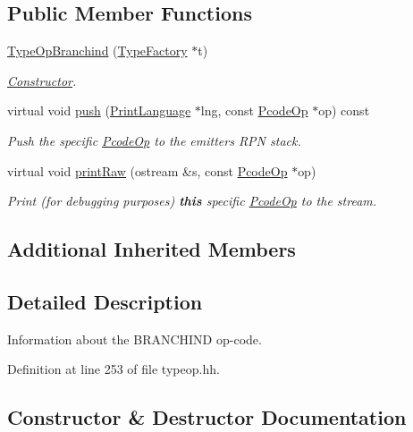 \subsection*{Public Member Functions}
\begin{DoxyCompactItemize}
\item 
\mbox{\hyperlink{class_type_op_branchind_abc5fb092c4a11234f6d6ab1912fa1010}{Type\+Op\+Branchind}} (\mbox{\hyperlink{class_type_factory}{Type\+Factory}} $\ast$t)
\begin{DoxyCompactList}\small\item\em \mbox{\hyperlink{class_constructor}{Constructor}}. \end{DoxyCompactList}\item 
virtual void \mbox{\hyperlink{class_type_op_branchind_aca034f61b2717d8865fd7bf8cb71a5f3}{push}} (\mbox{\hyperlink{class_print_language}{Print\+Language}} $\ast$lng, const \mbox{\hyperlink{class_pcode_op}{Pcode\+Op}} $\ast$op) const
\begin{DoxyCompactList}\small\item\em Push the specific \mbox{\hyperlink{class_pcode_op}{Pcode\+Op}} to the emitter\textquotesingle{}s R\+PN stack. \end{DoxyCompactList}\item 
virtual void \mbox{\hyperlink{class_type_op_branchind_a7defc7498466ee8a3998f08f41388984}{print\+Raw}} (ostream \&s, const \mbox{\hyperlink{class_pcode_op}{Pcode\+Op}} $\ast$op)
\begin{DoxyCompactList}\small\item\em Print (for debugging purposes) {\bfseries{this}} specific \mbox{\hyperlink{class_pcode_op}{Pcode\+Op}} to the stream. \end{DoxyCompactList}\end{DoxyCompactItemize}
\subsection*{Additional Inherited Members}


\subsection{Detailed Description}
Information about the B\+R\+A\+N\+C\+H\+I\+ND op-\/code. 

Definition at line 253 of file typeop.\+hh.



\subsection{Constructor \& Destructor Documentation}
\mbox{\label{class_type_op_branchind_abc5fb092c4a11234f6d6ab1912fa1010}} 
